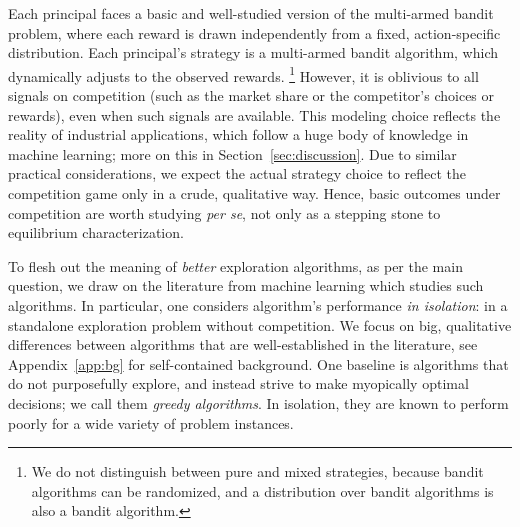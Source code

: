 Each principal faces a basic and well-studied version of the multi-armed bandit problem, where each reward is drawn independently from a fixed, action-specific distribution. Each principal's strategy is a multi-armed bandit algorithm,
which dynamically adjusts to the observed rewards.%
\footnote{We do not distinguish between pure and mixed strategies, because bandit algorithms can be randomized, and a distribution over bandit algorithms is also a bandit algorithm.}
However, it is oblivious to all signals on competition (such as the market share or the competitor's choices or rewards), even when such signals are available.
This modeling choice reflects the reality of industrial applications, which follow a huge body of knowledge in machine learning; more on this in Section~\ref{sec:discussion}.
Due to similar practical considerations, we expect the actual strategy choice to reflect the competition game only in a crude, qualitative way. Hence,  basic outcomes under competition are worth studying \emph{per se}, not only as a stepping stone to equilibrium characterization.

To flesh out the meaning of \emph{better} exploration algorithms, as per the main question, we draw on the literature from machine learning which studies such algorithms. In particular, one considers algorithm's performance \emph{in isolation}: in a standalone exploration problem without competition. We focus on big, qualitative differences between algorithms that are well-established in the literature, see Appendix~\ref{app:bg} for self-contained background.
One baseline is algorithms that do not purposefully explore, and instead strive to make myopically optimal decisions; we call them \emph{greedy algorithms}. In isolation, they are known to perform poorly for a wide variety of problem instances.

